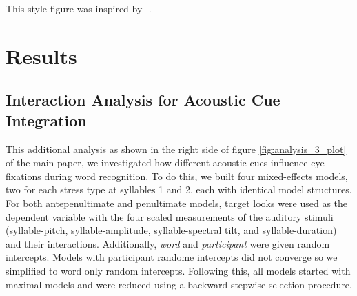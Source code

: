 \documentclass[sn-apa]{sn-jnl} %
\begin{document}
This style figure was inspired by-  \cite{AOW}. 

\section{Results}

\subsection{Interaction Analysis for Acoustic Cue Integration}

This additional analysis as shown in the right side of figure \ref{fig:analysis_3_plot} of the main paper, we investigated how different acoustic cues influence eye-fixations during word recognition. To do this, we built four mixed-effects models, two for each stress type at syllables 1 and 2, each with identical model structures. For both antepenultimate and penultimate models, target looks were used as the dependent variable with the four scaled measurements of the auditory stimuli (syllable-pitch, syllable-amplitude, syllable-spectral tilt, and syllable-duration) and their interactions. Additionally, \textit{word} and \textit{participant} were given random intercepts. Models with participant randome intercepts did not converge so we simplified to word only random intercepts. Following this, all models started with maximal models and were reduced using a backward stepwise selection procedure. 
\end{document}
